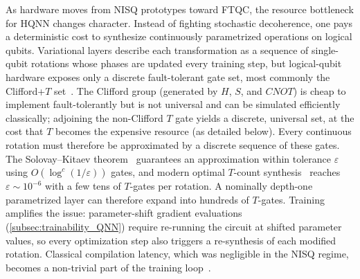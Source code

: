 \documentclass[aps,10pt,groupedaddress,prx,superscriptaddress,twocolumn,balancelastpage, tightenlines]{revtex4-2}
\theoremstyle{plain}  %
\begin{document}
As hardware moves from \gls{NISQ} prototypes toward \gls{FTQC}, the resource bottleneck for \gls{HQNN} changes character. Instead of fighting stochastic decoherence, one pays a deterministic cost to synthesize continuously parametrized operations on logical qubits. Variational layers describe each transformation as a sequence of single-qubit rotations whose phases are updated every training step, but logical-qubit hardware exposes only a discrete fault-tolerant gate set, most commonly the Clifford+$T$ set~\cite{Nielsen2011Quantum}. The Clifford group (generated by $H$, $S$, and $CNOT$) is cheap to implement fault-tolerantly but is not universal and can be simulated efficiently classically; adjoining the non-Clifford $T$ gate yields a discrete, universal set, at the cost that $T$ becomes the expensive resource (as detailed below). Every continuous rotation must therefore be approximated by a discrete sequence of these gates. The Solovay--Kitaev theorem~\cite{dawson_solovay-kitaev_2006} guarantees an approximation within tolerance $\varepsilon$ using $O(\log^c(1/\varepsilon))$ gates, and modern optimal $T$-count synthesis~\cite{ross_optimal_2016, kliuchnikov_synthesis_2013} reaches $\varepsilon \sim 10^{-6}$ with a few tens of $T$-gates per rotation. A nominally depth-one parametrized layer can therefore expand into hundreds of $T$-gates. Training amplifies the issue: parameter-shift gradient evaluations (\autoref{subsec:trainability_QNN}) require re-running the circuit at shifted parameter values, so every optimization step also triggers a re-synthesis of each modified rotation. Classical compilation latency, which was negligible in the \gls{NISQ} regime, becomes a non-trivial part of the training loop~\cite{ross_optimal_2016}.
\end{document}
